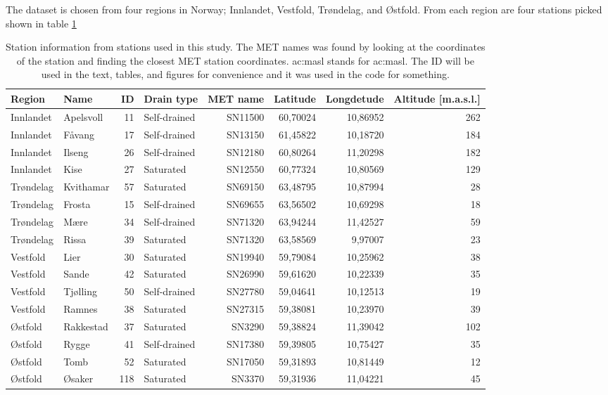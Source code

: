 The dataset is chosen from four regions in Norway; Innlandet, Vestfold, Trøndelag, and Østfold. From each region are four stations picked shown in table \ref{tab:station:names}
\begin{table}[h]
	\begin{adjustwidth}{-1in}{-1in}
		\centering
		\begin{tabular}{llrlrrrr}
			\hline Region&Name&ID&Drain type&MET name& Latitude&Longdetude&Altitude [m.a.s.l.]\\\hline
			Innlandet&Apelsvoll&11& Self-drained&SN11500&60,70024&10,86952&262\\
			Innlandet& Fåvang&17& Self-drained&SN13150&61,45822&10,18720&184\\
			Innlandet& Ilseng&26& Self-drained&SN12180&60,80264&11,20298&182\\
			Innlandet& Kise&27& Saturated&SN12550&60,77324&10,80569&129\\
			Trøndelag& Kvithamar&57& Saturated&SN69150&63,48795&10,87994&28\\
			Trøndelag& Frosta&15& Self-drained&SN69655&63,56502&10,69298&18\\
			Trøndelag& Mære&34& Self-drained&SN71320&63,94244&11,42527&59\\
			Trøndelag& Rissa&39& Saturated&SN71320&63,58569&9,97007&23\\
			Vestfold& Lier&30& Saturated&SN19940&59,79084&10,25962&38\\
			Vestfold& Sande&42& Saturated&SN26990&59,61620&10,22339&35\\
			Vestfold& Tjølling&50& Self-drained&SN27780&59,04641&10,12513&19\\
			Vestfold& Ramnes&38& Saturated&SN27315&59,38081&10,23970&39\\
			Østfold& Rakkestad&37& Saturated&SN3290&59,38824&11,39042&102\\
			Østfold& Rygge&41& Self-drained&SN17380&59,39805&10,75427&35\\
			Østfold& Tomb&52& Saturated&SN17050&59,31893&10,81449&12\\
			Østfold& Øsaker&118& Saturated&SN3370&59,31936&11,04221&45\\\hline
		\end{tabular}
	\end{adjustwidth}
	\caption[Staion information for each station/w location and MET-ID]{Station information from stations used in this study. The MET names was found by looking at the coordinates of the station and finding the closest MET station coordinates. \acrshort{ac:masl} stands for \acrlong{ac:masl}. The ID will be used in the text, tables, and figures for convenience and it was used in the code for something.}
	\label{tab:station:names}
\end{table}

